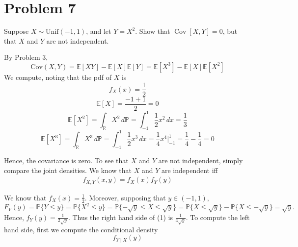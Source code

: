 \documentclass[11pt]{article}
\newcommand{\Cov}{\text{Cov}}
\newcommand{\bbE}{\mathbb{E}}
\newcommand{\bbP}{\mathbb{P}}
\newcommand{\bbR}{\mathbb{R}}
\begin{document}
\section*{Problem 7}
\begin{problem}
    Suppose \( X \sim \text{Unif}(-1,1) \), and let \( Y = X^2 \). Show that \( \operatorname{Cov}[X,Y] = 0 \), but that \( X \) and \( Y \) are not independent.
\end{problem}
\begin{solution}
    By Problem 3,
\[\Cov(X,Y) = \bbE[XY] - \bbE[X]\bbE[Y] = \bbE[X^3] - \bbE[X]\bbE[X^2]\] We compute, noting that the pdf of $X$ is 
\[f_X(x) = \frac{1}{2}\]
\[\bbE[X] = \frac{-1 + 1}{2} = 0\]
\[\bbE[X^2] = \int_{\bbR} X^2\,d\bbP = \int_{-1}^1 \frac{1}{2}x^2 \,dx =  \frac{1}{3}\]
\[\bbE[X^3] = \int_{\bbR} X^3\,d\bbP = \int_{-1}^1 \frac{1}{2}x^3 \,dx = \frac{1}{4}x^4 \bigg|_{-1}^1 = \frac{1}{4} - \frac{1}{4} = 0\]

Hence, the covariance is zero. To see that $X$ and $Y$ are not independent, simply compare the joint densities. We know that $X$ and $Y$ are independent iff
\begin{align}
f_{X,Y}(x,y) = f_X(x)f_Y(y)    
\end{align}

We know that $f_X(x) = \frac{1}{2}.$ Moreover, supposing that $y \in (-1,1),$
\[F_Y(y) = \bbP\{Y \leq y\} = \bbP\{X^2 \leq y\} = \bbP\{-\sqrt{y} \leq X \leq \sqrt{y}\} = \bbP\{X \leq \sqrt{y}\} - \bbP\{X \leq -\sqrt{y}\} =
\sqrt{y}.\] Hence, $f_Y(y) = \frac{1}{2\sqrt{y}}.$ Thus the right hand side of (1) is $\frac{1}{4\sqrt{y}}.$ To compute the left hand side, first we compute the conditional density 
\[f_{Y \mid X}(y)\] 
\end{solution}

\newpage
\end{document}
